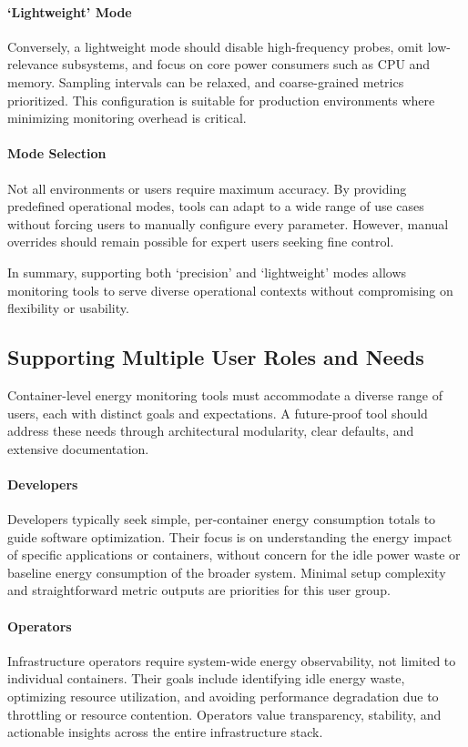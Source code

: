 \paragraph{‘Lightweight’ Mode}
Conversely, a lightweight mode should disable high-frequency probes, omit low-relevance subsystems, and focus on core power consumers such as CPU and memory. Sampling intervals can be relaxed, and coarse-grained metrics prioritized. This configuration is suitable for production environments where minimizing monitoring overhead is critical.

\paragraph{Mode Selection}
Not all environments or users require maximum accuracy. By providing predefined operational modes, tools can adapt to a wide range of use cases without forcing users to manually configure every parameter. However, manual overrides should remain possible for expert users seeking fine control.

In summary, supporting both ‘precision’ and ‘lightweight’ modes allows monitoring tools to serve diverse operational contexts without compromising on flexibility or usability.

\subsection{Supporting Multiple User Roles and Needs}
\label{sec:future-user-roles}

Container-level energy monitoring tools must accommodate a diverse range of users, each with distinct goals and expectations. A future-proof tool should address these needs through architectural modularity, clear defaults, and extensive documentation.

\paragraph{Developers}
Developers typically seek simple, per-container energy consumption totals to guide software optimization. Their focus is on understanding the energy impact of specific applications or containers, without concern for the idle power waste or baseline energy consumption of the broader system. Minimal setup complexity and straightforward metric outputs are priorities for this user group.

\paragraph{Operators}
Infrastructure operators require system-wide energy observability, not limited to individual containers. Their goals include identifying idle energy waste, optimizing resource utilization, and avoiding performance degradation due to throttling or resource contention. Operators value transparency, stability, and actionable insights across the entire infrastructure stack.

